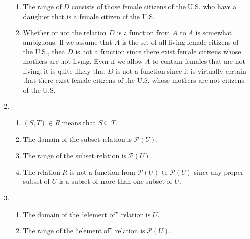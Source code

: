 \begin{enumerate}
\begin{enumerate}
\item The range of  $D$  consists of those female citizens of the U.S. who have a daughter that is a female citizen of the U.S.

\item Whether or not the relation $D$ is a function from $A$ to $A$ is somewhat ambiguous.  If we assume that $A$ is the set of all living female citizens of the U.S., then $D$ is not a function since there exist female citizens whose mothers are not living.  Even if we allow $A$ to contain females that are not living, it is quite likely that $D$ is not a function since it is virtually certain that there exist female citizens of the U.S. whose mothers are not citizens of the U.S.

\end{enumerate}



\item \begin{enumerate}
\item $\left( {S, T} \right) \in R$ means that $S \subseteq T$.

\item The domain of the subset relation is $\mathcal{P} \left( U \right)$.

\item The range of the subset relation is $\mathcal{P} \left( U \right)$.


\item The relation $R$ is not a function from $\mathcal{P} \left( U \right)$ to 
$\mathcal{P} \left( U \right)$ since any proper subset of $U$ is a subset of more than one subset of $U$.
\end{enumerate}



\item \begin{enumerate}
\item The domain of the ``element of'' relation is $U$.

\item The range of the ``element of'' relation is $\mathcal{P} \left( U \right)$.


\end{enumerate}
\end{enumerate}
